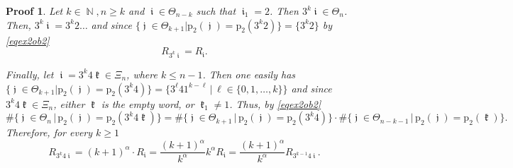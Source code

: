 \documentclass[10pt,a4paper]{amsart}
\newtheorem{Proof}{Proof}
\DeclareMathOperator{\N}{\mathbb{N}}
\DeclareMathOperator{\iii}{\mathfrak{i}}
\DeclareMathOperator{\jjj}{\mathfrak{j}}
\DeclareMathOperator{\kkk}{\mathfrak{k}}
\begin{document}
\begin{Proof}
Let $k\in \N, n\geq k$ and $\iii \in \Theta_{n-k}$ such that $\iii_1 = 2$. Then $3^k\iii \in \Theta_n$. Then, $3^k\iii = 3^k2\dots$ and since $\{\jjj \in \Theta_{k+1} | \mathrm{p}_2(\jjj) = \mathrm{p}_2(3^k2)\} = \{3^k2\}$ by \eqref{eqex2ob2}
\[R_{3^k\iii} = R_{\iii}.\]

Finally, let $\iii = 3^k4\kkk \in \Xi_n$, where $k \leq n-1$. Then one easily has $\{\jjj \in \Theta_{k+1}| \mathrm{p}_2(\jjj) = \mathrm{p}_2(3^k4)\} = \big\{3^\ell41^{k-\ell} \, \big|\, \ell \in \{0,1,\dots,k\}\big\}$ and since $3^k4\kkk \in \Xi_n$, either $\kkk$ is the empty word, or $\kkk_1 \neq 1$. Thus, by \eqref{eqex2ob2}
\[
\#\{\jjj \in \Theta_n\, \big|\, \mathrm{p}_{2}(\jjj) = \mathrm{p}_2 (3^k4\kkk)\} = \#\{\jjj \in \Theta_{k+1}\, \big|\, \mathrm{p}_{2}(\jjj) = \mathrm{p}_2 (3^k4)\} \cdot \#\{\jjj \in \Theta_{n-k-1}\, \big|\, \mathrm{p}_{2}(\jjj) = \mathrm{p}_2 (\kkk)\}.
\] 
Therefore, for every $k\geq 1$
\[R_{3^k4\iii} = (k+1)^\alpha \cdot R_{\iii}=\frac{(k+1)^\alpha}{k^\alpha} k^\alpha R_{\iii}=\frac{(k+1)^\alpha}{k^\alpha} R_{3^{k-1}4\iii}.\]



\end{Proof}
\end{document}
